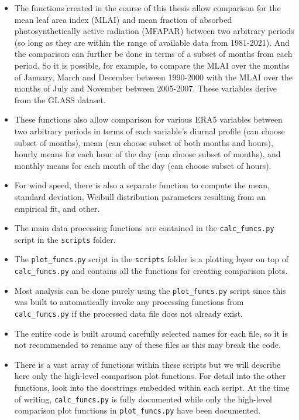 \begin{itemize}
	\item The functions created in the course of this thesis allow comparison for the mean leaf area index (MLAI) and mean fraction of absorbed photosynthetically active radiation (MFAPAR) between two arbitrary periods (so long as they are within the range of available data from 1981-2021). And the comparison can further be done in terms of a subset of months from each period. So it is possible, for example, to compare the MLAI over the months of January, March and December between 1990-2000 with the MLAI over the months of July and November between 2005-2007. These variables derive from the GLASS dataset.
	\item These functions also allow comparison for various ERA5 variables between two arbitrary periods in terms of each variable's diurnal profile (can choose subset of months), mean (can choose subset of both months and hours), hourly means for each hour of the day (can choose subset of months), and monthly means for each month of the day (can choose subset of hours).
	\item For wind speed, there is also a separate function to compute the mean, standard deviation, Weibull distribution parameters resulting from an empirical fit, and other.
	\item The main data processing functions are contained in the \verb+calc_funcs.py+ script in the \verb+scripts+ folder.
	\item The \verb+plot_funcs.py+ script in the \verb+scripts+ folder is a plotting layer on top of \verb+calc_funcs.py+ and contains all the functions for creating comparison plots.
	\item Most analysis can be done purely using the \verb+plot_funcs.py+ script since this was built to automatically invoke any processing functions from \verb+calc_funcs.py+ if the processed data file does not already exist.
	\item The entire code is built around carefully selected names for each file, so it is not recommended to rename any of these files as this may break the code.
	\item There is a vast array of functions within these scripts but we will describe here only the high-level comparison plot functions. For detail into the other functions, look into the docstrings embedded within each script. At the time of writing, \verb+calc_funcs.py+ is fully documented while only the high-level comparison plot functions in \verb+plot_funcs.py+ have been documented.

\end{itemize}
